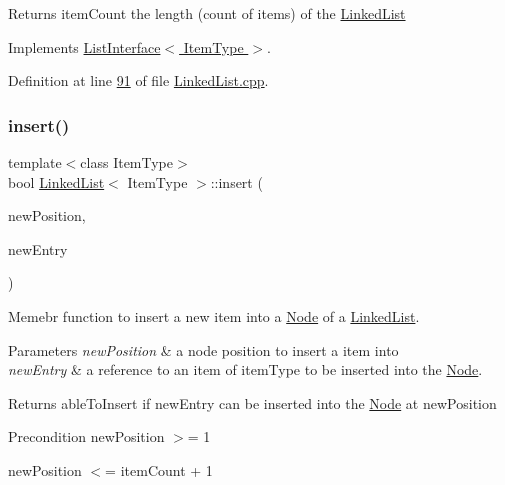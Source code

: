 \begin{DoxyReturn}{Returns}
item\+Count the length (count of items) of the \hyperlink{classLinkedList}{Linked\+List} 
\end{DoxyReturn}


Implements \hyperlink{classListInterface_afc85695d4137f1e29ff02e179c9f3221}{List\+Interface$<$ Item\+Type $>$}.



Definition at line \hyperlink{LinkedList_8cpp_source_l00091}{91} of file \hyperlink{LinkedList_8cpp_source}{Linked\+List.\+cpp}.

\mbox{\label{classLinkedList_ae8a19375505e87e2e4fc0e9b5afe4d4d}} 
\subsubsection{\texorpdfstring{insert()}{insert()}}
{\footnotesize\ttfamily template$<$class Item\+Type$>$ \\
bool \hyperlink{classLinkedList}{Linked\+List}$<$ Item\+Type $>$\+::insert (\begin{DoxyParamCaption}\item[{int}]{new\+Position,  }\item[{const Item\+Type \&}]{new\+Entry }\end{DoxyParamCaption})\hspace{0.3cm}{\ttfamily [virtual]}}



Memebr function to insert a new item into a \hyperlink{classNode}{Node} of a \hyperlink{classLinkedList}{Linked\+List}. 


\begin{DoxyParams}{Parameters}
{\em new\+Position} & a node position to insert a item into \\
\hline
{\em new\+Entry} & a reference to an item of item\+Type to be inserted into the \hyperlink{classNode}{Node}. \\
\hline
\end{DoxyParams}
\begin{DoxyReturn}{Returns}
able\+To\+Insert if new\+Entry can be inserted into the \hyperlink{classNode}{Node} at new\+Position 
\end{DoxyReturn}
\begin{DoxyPrecond}{Precondition}
new\+Position $>$= 1 

new\+Position $<$= item\+Count + 1 
\end{DoxyPrecond}


